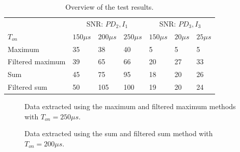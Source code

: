 \begin{table}[]
	\centering
\begin{tabular}{l|lll|lll|}
	& \multicolumn{3}{c|}{SNR: $PD_2, I_1$} & \multicolumn{3}{c|}{SNR: $PD_3, I_3$} \\
	$T_{on}$         & $150 \mu s$ & $200\mu s$ & $250\mu s$ & $150\mu s$  & $20\mu s$  & $25\mu s$  \\ \hline
	Maximum          & 35          & 38         & 40         & 5           & 5          & 5          \\
	Filtered maximum & 39          & 65         & 66         & 20          & 27         & 33         \\
	Sum              & 45          & 75         & 95         & 18          & 20         & 26         \\
	Filtered sum     & 50          & 105        & 100        & 19          & 20         & 24        
\end{tabular}
	\caption{Overview of the test results.\label{SNR_results}}
\end{table}


\begin{figure}
	\centering     %
	\caption{Data extracted using the maximum and filtered maximum methods with $T_{on} = 250\mu s$.\label{fig:SimpleFeatures}}
\end{figure}

\begin{figure}
	\centering     %
	\caption{Data extracted using the sum and filtered sum method with $T_{on} = 200\mu s$.\label{fig:complexFeatures}}
\end{figure}

